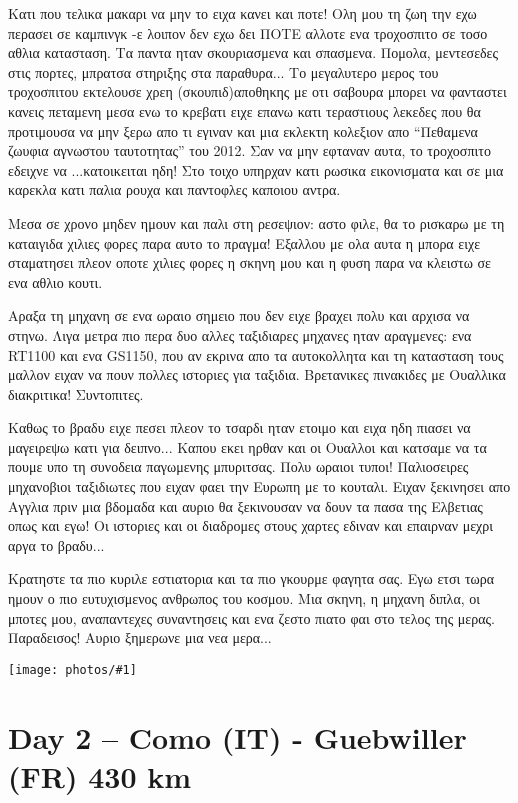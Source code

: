 \documentclass[]{book}
\newcommand\photo[1]{\noindent\texttt{[image: photos/\#1]}}
\begin{document}
Κατι που τελικα μακαρι να μην το ειχα κανει και ποτε! Ολη μου τη ζωη την εχω περασει σε καμπινγκ -ε λοιπον δεν εχω δει ΠΟΤΕ αλλοτε ενα τροχοσπιτο σε τοσο αθλια κατασταση. Τα παντα ηταν σκουριασμενα και σπασμενα. Πομολα, μεντεσεδες στις πορτες, μπρατσα στηριξης στα παραθυρα... Το μεγαλυτερο μερος του τροχοσπιτου εκτελουσε χρεη (σκουπιδ)αποθηκης με οτι σαβουρα μπορει να φανταστει κανεις πεταμενη μεσα ενω το κρεβατι ειχε επανω κατι τεραστιους λεκεδες που θα προτιμουσα να μην ξερω απο τι εγιναν και μια εκλεκτη κολεξιον απο ``Πεθαμενα ζωυφια αγνωστου ταυτοτητας'' του 2012. 
Σαν να μην εφταναν αυτα, το τροχοσπιτο εδειχνε να ...κατοικειται ηδη! Στο τοιχο υπηρχαν κατι ρωσικα εικονισματα και σε μια καρεκλα κατι παλια ρουχα και παντοφλες καποιου αντρα.

Μεσα σε χρονο μηδεν ημουν και παλι στη ρεσεψιον: αστο φιλε, θα το ρισκαρω με τη καταιγιδα χιλιες φορες παρα αυτο το πραγμα!
Εξαλλου με ολα αυτα η μπορα ειχε σταματησει πλεον οποτε χιλιες φορες η σκηνη μου και η φυση παρα να κλειστω σε ενα αθλιο κουτι.

Αραξα τη μηχανη σε ενα ωραιο σημειο που δεν ειχε βραχει πολυ και αρχισα να στηνω. 
Λιγα μετρα πιο περα δυο αλλες ταξιδιαρες μηχανες ηταν αραγμενες: ενα RT1100 και ενα GS1150, που αν εκρινα απο τα αυτοκολλητα και τη κατασταση τους μαλλον ειχαν να πουν πολλες ιστοριες για ταξιδια. 
Βρετανικες πινακιδες με Ουαλλικα διακριτικα! Συντοπιτες.

Καθως το βραδυ ειχε πεσει πλεον το τσαρδι ηταν ετοιμο και ειχα ηδη πιασει να μαγειρεψω κατι για δειπνο...
Καπου εκει ηρθαν και οι Ουαλλοι και κατσαμε να τα πουμε υπο τη συνοδεια παγωμενης μπυριτσας. 
Πολυ ωραιοι τυποι! Παλιοσειρες μηχανοβιοι ταξιδιωτες που ειχαν φαει την Ευρωπη με το κουταλι. Ειχαν ξεκινησει απο Αγγλια πριν μια βδομαδα και αυριο θα ξεκινουσαν να δουν τα πασα της Ελβετιας οπως και εγω! Οι ιστοριες και οι διαδρομες στους χαρτες εδιναν και επαιρναν μεχρι αργα το βραδυ...

Κρατηστε τα πιο κυριλε εστιατορια και τα πιο γκουρμε φαγητα σας. Εγω ετσι τωρα ημουν ο πιο ευτυχισμενος ανθρωπος του κοσμου. Μια σκηνη, η μηχανη διπλα, οι μποτες μου, αναπαντεχες συναντησεις και ενα ζεστο πιατο φαι στο τελος της μερας. Παραδεισος! 
Αυριο ξημερωνε μια νεα μερα...

\photo{18.jpg}

\chapter*{Day 2 -- Como (IT) - Guebwiller (FR) 430 km}
\end{document}
